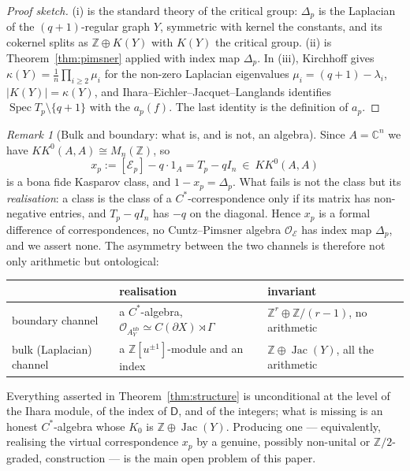 \documentclass[11pt]{amsart}
\numberwithin{equation}{section}
\theoremstyle{definition}
\theoremstyle{remark}
\newtheorem{remark}[theorem]{Remark}
\newcommand{\Z}{\mathbb{Z}}
\newcommand{\C}{\mathbb{C}}
\newcommand{\cE}{\mathcal{E}}
\newcommand{\cO}{\mathcal{O}}
\newcommand{\Jac}{\operatorname{Jac}}
\newcommand{\Spec}{\operatorname{Spec}}
\begin{document}
\begin{proof}[Proof sketch]
(i) is the standard theory of the critical group: $\Delta_p$ is the Laplacian of the
$(q+1)$-regular graph $Y$, symmetric with kernel the constants, and its cokernel splits
as $\Z\oplus K(Y)$ with $K(Y)$ the critical group. (ii) is
Theorem~\ref{thm:pimsner} applied with index map $\Delta_p$. In (iii), Kirchhoff gives
$\kappa(Y)=\frac1n\prod_{i\ge2}\mu_i$ for the non-zero Laplacian eigenvalues
$\mu_i=(q+1)-\lambda_i$, $|K(Y)|=\kappa(Y)$, and Ihara--Eichler--Jacquet--Langlands
identifies $\Spec T_p\setminus\{q+1\}$ with the $a_p(f)$. The last identity is the
definition of $a_p$.
\end{proof}

\begin{remark}[Bulk and boundary: what is, and is not, an algebra]\label{rem:noalgebra}
Since $A=\C^n$ we have $KK^0(A,A)\cong M_n(\Z)$, so
\[
x_p:=[\cE_p]-q\cdot 1_A=T_p-qI_n\ \in\ KK^0(A,A)
\]
is a bona fide Kasparov class, and $1-x_p=\Delta_p$. What fails is not the class but its
\emph{realisation}: a class is the class of a $C^*$-correspondence only if its matrix has
non-negative entries, and $T_p-qI_n$ has $-q$ on the diagonal. Hence $x_p$ is a formal
difference of correspondences, no Cuntz--Pimsner algebra $\cO_\cE$ has index map
$\Delta_p$, and we assert none. The asymmetry between the two channels is therefore not
only arithmetic but ontological:
\begin{center}\small
\begin{tabular}{lll}
\toprule
& realisation & invariant\\
\midrule
boundary channel & a $C^*$-algebra, $\cO_{A^{\mathrm{nb}}_Y}\simeq C(\partial X)\rtimes\Gamma$
& $\Z^r\oplus\Z/(r-1)$, no arithmetic\\
bulk (Laplacian) channel & a $\Z[u^{\pm1}]$-module and an index & $\Z\oplus\Jac(Y)$, all the arithmetic\\
\bottomrule
\end{tabular}
\end{center}
Everything asserted in Theorem~\ref{thm:structure} is unconditional at the level of the
Ihara module, of the index of $\mathsf{D}$, and of the integers; what is missing is an
honest $C^*$-algebra whose $K_0$ is $\Z\oplus\Jac(Y)$. Producing one --- equivalently,
realising the virtual correspondence $x_p$ by a genuine, possibly non-unital or
$\Z/2$-graded, construction --- is the main open problem of this paper.


\end{remark}
\end{document}
